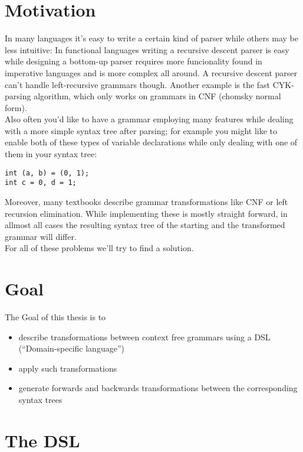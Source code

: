\documentclass[a4paper]{article}
\begin{document}
\section*{Motivation}
In many languages it's easy to write a certain kind of parser while others may be less intuitive: In functional languages writing a recursive descent parser is easy while designing a bottom-up parser requires more funcionality found in imperative languages and is more complex all around. A recursive descent parser can't handle left-recursive grammars though. Another example is the fast CYK-parsing algorithm, which only works on grammars in CNF (chomsky normal form).\\
Also often you'd like to have a grammar employing many features while dealing with a more simple syntax tree after parsing; for example you might like to enable both of these types of variable declarations while only dealing with one of them in your syntax tree:
\begin{verbatim}
int (a, b) = (0, 1);
int c = 0, d = 1;
\end{verbatim}
Moreover, many textbooks describe grammar transformations like CNF or left recursion elimination. While implementing these is mostly straight forward, in allmost all cases the resulting syntax tree of the starting and the transformed grammar will differ.\\
For all of these problems we'll try to find a solution.

\section*{Goal}
The Goal of this thesis is to
\begin{itemize}
\item describe transformations between context free grammars using a DSL (``Domain-specific language'')
\item apply such transformations
\item generate forwards and backwards transformations between the corresponding syntax trees
\end{itemize}

\section*{The DSL}
\end{document}
